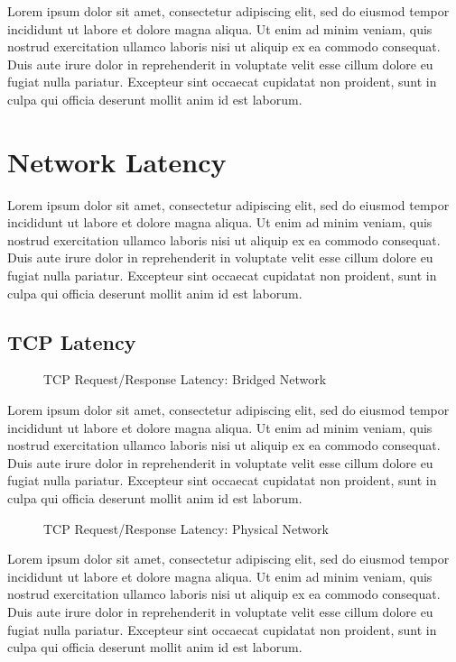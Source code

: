 Lorem ipsum dolor sit amet, consectetur adipiscing elit, sed do eiusmod tempor incididunt ut labore et dolore magna aliqua. Ut enim ad minim veniam, quis nostrud exercitation ullamco laboris nisi ut aliquip ex ea commodo consequat. Duis aute irure dolor in reprehenderit in voluptate velit esse cillum dolore eu fugiat nulla pariatur. Excepteur sint occaecat cupidatat non proident, sunt in culpa qui officia deserunt mollit anim id est laborum.


\section{Network Latency} %
\label{sec:networklatency}
Lorem ipsum dolor sit amet, consectetur adipiscing elit, sed do eiusmod tempor incididunt ut labore et dolore magna aliqua. Ut enim ad minim veniam, quis nostrud exercitation ullamco laboris nisi ut aliquip ex ea commodo consequat. Duis aute irure dolor in reprehenderit in voluptate velit esse cillum dolore eu fugiat nulla pariatur. Excepteur sint occaecat cupidatat non proident, sunt in culpa qui officia deserunt mollit anim id est laborum.

\subsection{TCP Latency} %
\label{sub:tcplatency}
\begin{figure}
    \centering
    \def\svgwidth{\columnwidth}
    
    \caption{TCP Request/Response Latency: Bridged Network}
    \label{fig:tcp_rr_bridge}
\end{figure}
Lorem ipsum dolor sit amet, consectetur adipiscing elit, sed do eiusmod tempor incididunt ut labore et dolore magna aliqua. Ut enim ad minim veniam, quis nostrud exercitation ullamco laboris nisi ut aliquip ex ea commodo consequat. Duis aute irure dolor in reprehenderit in voluptate velit esse cillum dolore eu fugiat nulla pariatur. Excepteur sint occaecat cupidatat non proident, sunt in culpa qui officia deserunt mollit anim id est laborum.
\begin{figure}
    \centering
    \def\svgwidth{\columnwidth}
    
    \caption{TCP Request/Response Latency: Physical Network}
    \label{fig:tcp_rr_phys}
\end{figure}

Lorem ipsum dolor sit amet, consectetur adipiscing elit, sed do eiusmod tempor incididunt ut labore et dolore magna aliqua. Ut enim ad minim veniam, quis nostrud exercitation ullamco laboris nisi ut aliquip ex ea commodo consequat. Duis aute irure dolor in reprehenderit in voluptate velit esse cillum dolore eu fugiat nulla pariatur. Excepteur sint occaecat cupidatat non proident, sunt in culpa qui officia deserunt mollit anim id est laborum.

